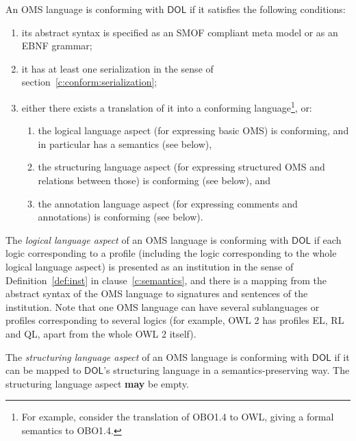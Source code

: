 \documentclass[10pt,fleqn,final]{scrreprt}
\newcommand{\cbs}[0]{\color{red}\xspace} %
\newcommand{\cbe}[0]{\color{black}\xspace} %
\newcommand*{\may}{\textbf{may}\xspace}
\newcommand*{\DOL}{\ensuremath{\mathsf{DOL}}\xspace}
\begin{document}
An OMS language is conforming with \DOL if it satisfies the following conditions:
\begin{enumerate}
\item its abstract syntax is specified as an SMOF compliant meta model
or as an EBNF grammar;
\item it has at least one serialization in the sense of section~\ref{c:conform:serialization};
\item either there exists a translation of it into a conforming
  language\footnote{For  example, consider the translation of OBO1.4
    to OWL, giving a formal semantics to OBO1.4.}, or:
\begin{enumerate}
\item the logical language aspect (for expressing basic OMS) is conforming, and in particular has a semantics (see below),
\item  the structuring language aspect (for expressing structured OMS and relations
between those) is conforming (see below), and
\item the annotation language aspect (for expressing comments and annotations)
is conforming (see below).
\end{enumerate}
\end{enumerate}


The \emph{logical language aspect} of an OMS language
is %
conforming with \DOL if each logic corresponding to a profile (including
the logic corresponding to the whole logical language aspect) is presented as an
institution \cbs in the sense of Definition~\ref{def:inst} in clause~\ref{c:semantics}\cbe , and there is a mapping from
the abstract syntax of the OMS language to signatures and sentences
of the institution.
Note that one OMS language can have several sublanguages or profiles 
corresponding to several logics (for example, OWL 2 has profiles EL, RL and QL, apart from the
whole OWL 2 itself).


The \emph{structuring language aspect} of an OMS language is conforming with \DOL if it can be
mapped to \DOL's structuring language in a semantics-preserving way. The structuring language aspect
\may be empty.
\end{document}
